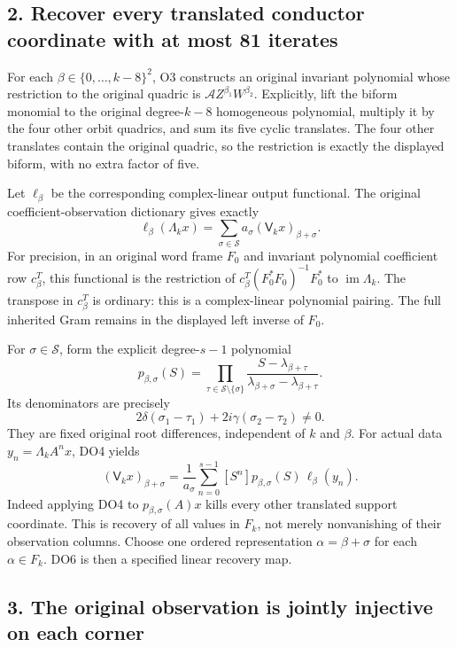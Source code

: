 \subsection{2. Recover every translated conductor coordinate with at most 81 iterates}\label{pdepth:recover-every-translated-conductor-coordinate-with-at-most-81-iterates}

For each \(\beta\in\{0,\ldots,k-8\}^2\), O3 constructs an original invariant polynomial whose restriction to the original quadric is \(\mathcal A Z^{\beta_1}W^{\beta_2}\). Explicitly, lift the biform monomial to the original degree-\(k-8\) homogeneous polynomial, multiply it by the four other orbit quadrics, and sum its five cyclic translates. The four other translates contain the original quadric, so the restriction is exactly the displayed biform, with no extra factor of five.

Let \(\ell_\beta\) be the corresponding complex-linear output functional. The original coefficient-observation dictionary gives exactly \[
\ell_\beta(\Lambda_k x)=
\sum_{\sigma\in\mathcal S}a_\sigma
(\mathsf V_kx)_{\beta+\sigma}.
\tag{DO4}
\] For precision, in an original word frame \(F_0\) and invariant polynomial coefficient row \(c_\beta^T\), this functional is the restriction of \(c_\beta^T(F_0^*F_0)^{-1}F_0^*\) to \(\operatorname{im}\Lambda_k\). The transpose in \(c_\beta^T\) is ordinary: this is a complex-linear polynomial pairing. The full inherited Gram remains in the displayed left inverse of \(F_0\).

For \(\sigma\in\mathcal S\), form the explicit degree-\(s-1\) polynomial \[
\boxed{\displaystyle
p_{\beta,\sigma}(S)=
\prod_{\tau\in\mathcal S\setminus\{\sigma\}}
\frac{S-\lambda_{\beta+\tau}}
{\lambda_{\beta+\sigma}-\lambda_{\beta+\tau}}.}
\tag{DO5}
\] Its denominators are precisely \[
2\delta(\sigma_1-\tau_1)+2i\gamma(\sigma_2-\tau_2)\ne0.
\] They are fixed original root differences, independent of \(k\) and \(\beta\). For actual data \(y_n=\Lambda_k A^n x\), DO4 yields \[
\boxed{\displaystyle
(\mathsf V_kx)_{\beta+\sigma}
=\frac1{a_\sigma}\sum_{n=0}^{s-1}
[S^n]p_{\beta,\sigma}(S)\,\ell_\beta(y_n).}
\tag{DO6}
\] Indeed applying DO4 to \(p_{\beta,\sigma}(A)x\) kills every other translated support coordinate. This is recovery of all values in \(F_k\), not merely nonvanishing of their observation columns. Choose one ordered representation \(\alpha=\beta+\sigma\) for each \(\alpha\in F_k\). DO6 is then a specified linear recovery map.

\subsection{3. The original observation is jointly injective on each corner}\label{pdepth:the-original-observation-is-jointly-injective-on-each-corner}

